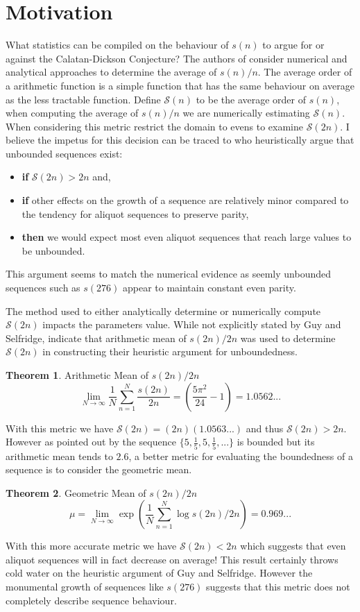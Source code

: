 \documentclass{article}
\theoremstyle{definition}
\newtheorem{theorem}{Theorem}[section]
\begin{document}
\section{Motivation}
What statistics can be compiled on the behaviour of $s(n)$ to argue for or against the Calatan-Dickson Conjecture? The authors of \cite{chum_guy_jacobson_mosunov_2018} consider numerical and analytical approaches to determine the average of $s(n) / n$. The average order of a arithmetic function is a simple function that has the same behaviour on average as the less tractable function. Define $\mathcal{S}(n)$ to be the average order of $s(n)$, when computing the average of $s(n) / n$ we are numerically estimating $\mathcal{S}(n)$. When considering this metric \cite{chum_guy_jacobson_mosunov_2018} restrict the domain to evens to examine $\mathcal{S}(2n)$. I believe the impetus for this decision can be traced to \cite{guy_selfridge_1975} who heuristically argue that unbounded sequences exist:
\begin{itemize}
    \item \textbf{if} $\mathcal{S}(2n) > 2n$ and,
    \item \textbf{if} other effects on the growth of a sequence are relatively minor compared to the tendency for aliquot sequences to preserve parity,
    \item \textbf{then} we would expect most even aliquot sequences that reach large values to be unbounded.
\end{itemize}
This argument seems to match the numerical evidence as seemly unbounded sequences such as $s(276)$ \cite{zimmermann_2016} appear to maintain constant even parity.

The method used to either analytically determine or numerically compute $\mathcal{S}(2n)$ impacts the parameters value. While not explicitly stated by Guy and Selfridge, \cite{bosma_kane_2010} indicate that arithmetic mean of $s(2n) / 2n$ was used to determine $\mathcal{S}(2n)$ in constructing their heuristic argument for unboundedness.
%
\begin{theorem} Arithmetic Mean of $s(2n) / 2n$
$$\lim_{N \to \infty} \frac{1}{N} \sum_{n = 1}^{N} \frac{s(2n)}{2n} = \left(\frac{5\pi^2}{24} - 1\right) = 1.0562...$$
\end{theorem}
%
With this metric we have $\mathcal{S}(2n) = (2n)(1.0563...)$ and thus $\mathcal{S}(2n) > 2n$. However as pointed out by \cite{bosma_kane_2010} the sequence $\{5, \frac{1}{5}, 5, \frac{1}{5}, ... \}$ is bounded but its arithmetic mean tends to $2.6$, a better metric for evaluating the boundedness of a sequence is to consider the geometric mean. 
%
\begin{theorem}Geometric Mean of $s(2n) / 2n$
$$\mu =\lim_{N \to \infty} \exp{\left( \frac{1}{N} \sum_{n=1}^{N} \log s(2n) / 2n \right) =  0.969...}$$
\end{theorem}
%
With this more accurate metric we have $\mathcal{S}(2n) < 2n$ which suggests that even aliquot sequences will in fact decrease on average! This result certainly throws cold water on the heuristic argument of Guy and Selfridge. However the monumental growth of sequences like $s(276)$ suggests that this metric does not completely describe sequence behaviour. 
\end{document}

